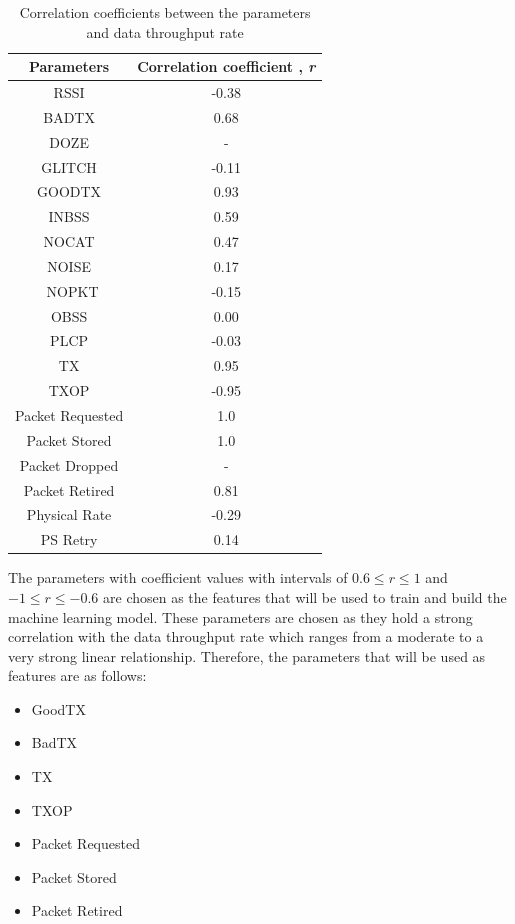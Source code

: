 \begin{table}[ht]
\centering
\begin{center}
\begin{tabular}{ |c|c| } 
  \hline
 Parameters & Correlation coefficient , \textit{r}\\ 
  \hline\hline
 RSSI & -0.38\\ 
 BADTX & 0.68\\ 
 DOZE & -\\ 
 GLITCH & -0.11\\ 
 GOODTX & 0.93\\ 
 INBSS & 0.59\\ 
 NOCAT & 0.47\\ 
 NOISE & 0.17\\\ 
 NOPKT & -0.15\\ 
 OBSS & 0.00\\ 
 PLCP & -0.03\\ 
 TX & 0.95\\ 
 TXOP & -0.95\\ 
 Packet Requested & 1.0\\ 
 Packet Stored & 1.0\\  
 Packet Dropped & -\\ 
 Packet Retired & 0.81\\ 
 Physical Rate & -0.29\\  
 PS Retry & 0.14\\ 
 \hline
\end{tabular}
\caption{Correlation coefficients between the parameters and data throughput rate}
\label{table:cc}
\end{center}
\end{table}

The parameters with coefficient values with intervals of $0.6\leq r \leq 1$ and $-1\leq r \leq -0.6$ are chosen as the features that will be used to train and build the machine learning model. These parameters are chosen as they hold a strong correlation with the data throughput rate which ranges from a moderate to a very strong linear relationship. Therefore, the parameters that will be used as features are as follows: 

\begin{itemize}
    \item GoodTX
    \item BadTX
    \item TX
    \item TXOP
    \item Packet Requested
    \item Packet Stored
    \item Packet Retired
\end{itemize}
 

